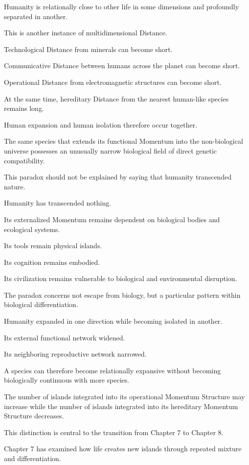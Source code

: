 Humanity is relationally close to other life in some dimensions and profoundly separated in another.

This is another instance of multidimensional Distance.

Technological Distance from minerals can become short.

Communicative Distance between humans across the planet can become short.

Operational Distance from electromagnetic structures can become short.

At the same time, hereditary Distance from the nearest human-like species remains long.

Human expansion and human isolation therefore occur together.

The same species that extends its functional Momentum into the non-biological universe possesses an unusually narrow biological field of direct genetic compatibility.

This paradox should not be explained by saying that humanity transcended nature.

Humanity has transcended nothing.

Its externalized Momentum remains dependent on biological bodies and ecological systems.

Its tools remain physical islands.

Its cognition remains embodied.

Its civilization remains vulnerable to biological and environmental disruption.

The paradox concerns not escape from biology, but a particular pattern within biological differentiation.

Humanity expanded in one direction while becoming isolated in another.

Its external functional network widened.

Its neighboring reproductive network narrowed.

A species can therefore become relationally expansive without becoming biologically continuous with more species.

The number of islands integrated into its operational Momentum Structure may increase while the number of islands integrated into its hereditary Momentum Structure decreases.

This distinction is central to the transition from Chapter 7 to Chapter 8.

Chapter 7 has examined how life creates new islands through repeated mixture and differentiation.


